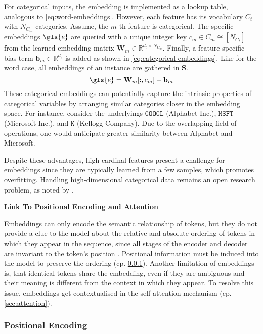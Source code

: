 For categorical inputs, the embedding is implemented as a lookup table, analogous to \cref{eq:word-embeddings}. However, each feature has
its vocabulary $C_t$ with $N_{C_m}$ categories. Assume, the $m$-th feature is categorical. The specific embeddings $\gls{e}$ are queried with a unique integer key $c_{m} \in C_m \cong\left[N_{C_t}\right]$ from the learned embedding matrix $\mathbf{W}_m \in \mathbb{R}^{d_e \times N_{C_m}}$. Finally, a feature-specific bias term $\mathbf{b}_m \in \mathbb{R}^{d_{e}}$ is added as shown in \cref{eq:categorical-embeddings}. Like for the word case, all embeddings of an instance are gathered in $\mathbf{S}$.
\begin{equation}
    \gls{e}=\mathbf{W}_m[:,c_{m}] +\mathbf{b}_m
    \label{eq:categorical-embeddings}
\end{equation}
These categorical embeddings can potentially capture the intrinsic properties of categorical variables by arranging similar categories closer in the embedding space. For instance, consider the underlyings $\mathtt{GOOGL}$ (Alphabet Inc.), $\mathtt{MSFT}$ (Microsoft Inc.), and $\mathtt{K}$ (Kellogg Company). Due to the overlapping field of operations, one would anticipate greater similarity between Alphabet and Microsoft.

Despite these advantages, high-cardinal features present a challenge for embeddings since they are typically learned from a few samples, which promotes \gls{overfitting}. Handling high-dimensional categorical data remains an open research problem, as noted by \textcite[][2]{borisovDeepNeuralNetworks2022}.

\textbf{Link To Positional Encoding and Attention}

Embeddings can only encode the semantic relationship of tokens, but they do not provide a clue to the model about the relative and absolute ordering of tokens in which they appear in the sequence, since all stages of the encoder and decoder are invariant to the token's position \autocite[][3744]{leeSetTransformerFramework2019}. Positional information must be induced into the model to preserve the ordering (cp. \cref{sec:positional-encoding}). Another limitation of embeddings is, that identical tokens share the embedding, even if they are ambiguous and their meaning is different from the context in which they appear. To resolve this issue, embeddings get contextualised in the self-attention mechanism (cp. \cref{sec:attention}).

\subsubsection{Positional Encoding}\label{sec:positional-encoding}

